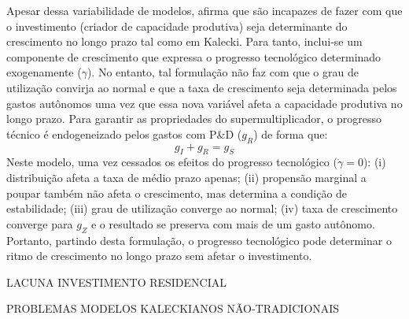 Apesar dessa variabilidade de modelos, \textcite{dutt_observations_2018} afirma que são incapazes de fazer com que o investimento (criador de capacidade produtiva) seja determinante do crescimento no longo prazo tal como em Kalecki. Para tanto, inclui-se um componente de crescimento que expressa o progresso tecnológico determinado exogenamente ($\gamma$). No entanto, tal formulação não faz com que o grau de utilização convirja ao normal e que a taxa de crescimento seja determinada pelos gastos autônomos uma vez que essa nova variável afeta a capacidade produtiva no longo prazo. Para garantir as propriedades do supermultiplicador, o progresso técnico é endogeneizado pelos gastos com P\&D ($g_R$) de forma que:
$$
g_I + g_R = g_S
$$
Neste modelo, uma vez cessados os efeitos do progresso tecnológico ($\dot \gamma = 0$): 
	(i) distribuição afeta a taxa de médio prazo apenas; 
	(ii) propensão marginal a poupar também não afeta o crescimento, mas determina a condição de estabilidade; 
	(iii) grau de utilização converge ao normal; 
	(iv) taxa de crescimento converge para $g_Z$ e o resultado se preserva com mais de um gasto autônomo. Portanto, partindo desta formulação, o progresso tecnológico pode determinar o ritmo de crescimento no longo prazo sem afetar o investimento.


LACUNA INVESTIMENTO RESIDENCIAL


PROBLEMAS MODELOS KALECKIANOS NÃO-TRADICIONAIS

